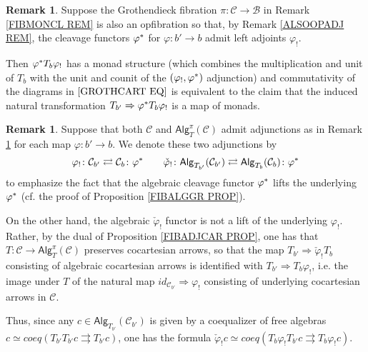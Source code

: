 \documentclass[a4paper,10pt
,draft
]{article}%
\numberwithin{equation}{section}
\numberwithin{figure}{section}
\theoremstyle{definition} %
\newtheorem{remark}[equation]{Remark}%
\newcommand{\1}{\ensuremath{\mathbbm 1}}%
\begin{document}
\begin{remark}\label{ABSPUSH REM}
	Suppose the Grothendieck fibration 
	$\pi \colon \mathcal{C} \to \mathcal{B}$
	in Remark \ref{FIBMONCL REM}
	is also an opfibration so that,
	by Remark \ref{ALSOOPADJ REM},
	the cleavage functors $\varphi^{\**}$ for 
	$\varphi \colon b' \to b$
	admit left adjoints $\varphi_!$.

	Then $\varphi^{\**} T_b \varphi_!$ has a monad structure
	(which combines the multiplication and unit of $T_b$ with the unit and counit of the $(\varphi_!,\varphi^{\**})$ adjunction)
	and commutativity of the diagrams in $\eqref{GROTHCART EQ}$
	is equivalent to the claim that the induced natural transformation
	$T_{b'} \Rightarrow \varphi^{\**}T_{b}\varphi_{!}$
	is a map of monads.
\end{remark}



\begin{remark}\label{ALGPUSHLL REM}
Suppose that both $\mathcal{C}$ and $\mathsf{Alg}_T^{\pi}(\mathcal{C})$
admit adjunctions as in 
Remark \ref{ABSPUSH REM} for each map $\varphi \colon b' \to b$.
We denote these two adjunctions by
\[
\varphi_! \colon \mathcal{C}_{b'} 
\rightleftarrows
\mathcal{C}_{b}\colon \varphi^{\**}
\qquad
\check{\varphi}_! \colon \mathsf{Alg}_{T_{b'}}(\mathcal{C}_{b'}) 
\rightleftarrows 
\mathsf{Alg}_{T_{b}}(\mathcal{C}_{b})\colon \varphi^{\**}
\]
to emphasize the fact that the algebraic cleavage functor $\varphi^{\**}$ lifts the underlying $\varphi^{\**}$ (cf. the proof of Proposition \ref{FIBALGGR PROP}).


On the other hand, the algebraic $\check{\varphi}_!$ functor is not a lift of
the underlying $\varphi_!$.
Rather, by the dual of Proposition \ref{FIBADJCAR PROP},
one has that $T \colon \mathcal{C} \to \mathsf{Alg}_T^{\pi}(\mathcal{C})$ preserves cocartesian arrows,
so that the map $T_{b'} \Rightarrow \check{\varphi}_! T_{b}$
consisting of algebraic cocartesian arrows
is identified with 
$T_{b'} \Rightarrow T_{b} \varphi_!$,
i.e. the image under $T$
of the natural map
$id_{\mathcal{C}_{b'}} \Rightarrow \varphi_!$
consisting of underlying cocartesian arrows in $\mathcal{C}$.


Thus, since any 
$c \in \mathsf{Alg}_{T_{b'}}(\mathcal{C}_{b'})$
is given by a coequalizer of free algebras
$c \simeq coeq(T_{b'}T_{b'} c \rightrightarrows T_{b'} c)$,
one has the formula
$\check{\varphi}_! c \simeq 
coeq(T_{b}\varphi_!T_{b'} c \rightrightarrows T_{b}\varphi_! c)$.
\end{remark}
\end{document}
